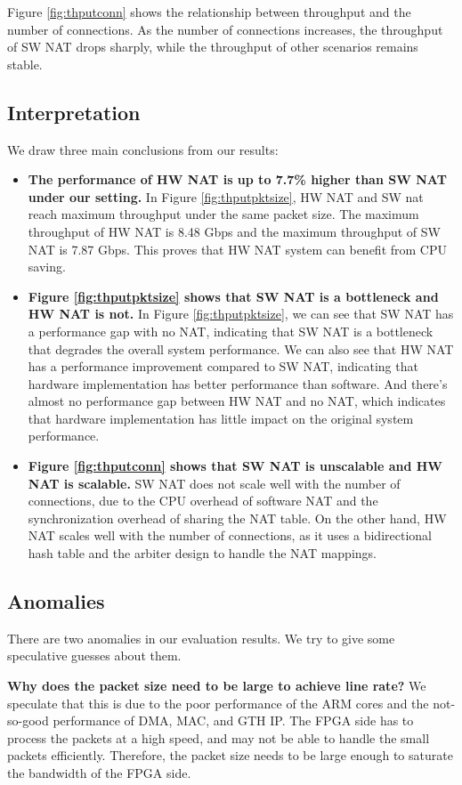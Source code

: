Figure \ref{fig:thputconn} shows the relationship between throughput and the number of connections. As the number of connections increases, the throughput of SW NAT drops sharply, while the throughput of other scenarios remains stable. 

\subsection{Interpretation}
We draw three main conclusions from our results:
\begin{itemize}
    \item \textbf{The performance of HW NAT is up to 7.7\% higher than SW NAT under our setting.} In Figure \ref{fig:thputpktsize}, HW NAT and SW nat reach maximum throughput under the same packet size. The maximum throughput of HW NAT is 8.48 Gbps and the maximum throughput of SW NAT is 7.87 Gbps. This proves that HW NAT system can benefit from CPU saving.
    \item \textbf{Figure \ref{fig:thputpktsize} shows that SW NAT is a bottleneck and HW NAT is not.}
    In Figure \ref{fig:thputpktsize}, we can see that SW NAT has a performance gap with no NAT, indicating that SW NAT is a bottleneck that degrades the overall system performance. We can also see that HW NAT has a performance improvement compared to SW NAT, indicating that hardware implementation has better performance than software. And there's almost no performance gap between HW NAT and no NAT, which indicates that hardware implementation has little impact on the original system performance.
    \item \textbf{Figure \ref{fig:thputconn} shows that SW NAT is unscalable and HW NAT is scalable.}
    SW NAT does not scale well with the number of connections, due to the CPU overhead of software NAT and the synchronization overhead of sharing the NAT table. On the other hand, HW NAT scales well with the number of connections, as it uses a bidirectional hash table and the arbiter design to handle the NAT mappings.
\end{itemize}






\subsection{Anomalies}
There are two anomalies in our evaluation results. We try to give some speculative guesses about them.

\textbf{Why does the packet size need to be large to achieve line rate?} We speculate that this is due to the poor performance of the ARM cores and the not-so-good performance of DMA, MAC, and GTH IP. The FPGA side has to process the packets at a high speed, and may not be able to handle the small packets efficiently. Therefore, the packet size needs to be large enough to saturate the bandwidth of the FPGA side.

